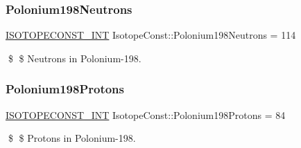 \subsubsection{\texorpdfstring{Polonium198\+Neutrons}{Polonium198Neutrons}}
{\footnotesize\ttfamily \mbox{\hyperlink{group___isotope_const-_macros_ga5f18360b3e99483a35c32d789e62621c}{I\+S\+O\+T\+O\+P\+E\+C\+O\+N\+S\+T\+\_\+\+I\+NT}} Isotope\+Const\+::\+Polonium198\+Neutrons = 114}

\$ \$ Neutrons in Polonium-\/198. \mbox{\label{group___isotope_const-_polonium-_po198_ga08cad3c8a8401ae6e3da30741a8fb74b}} 
\subsubsection{\texorpdfstring{Polonium198\+Protons}{Polonium198Protons}}
{\footnotesize\ttfamily \mbox{\hyperlink{group___isotope_const-_macros_ga5f18360b3e99483a35c32d789e62621c}{I\+S\+O\+T\+O\+P\+E\+C\+O\+N\+S\+T\+\_\+\+I\+NT}} Isotope\+Const\+::\+Polonium198\+Protons = 84}

\$ \$ Protons in Polonium-\/198. 